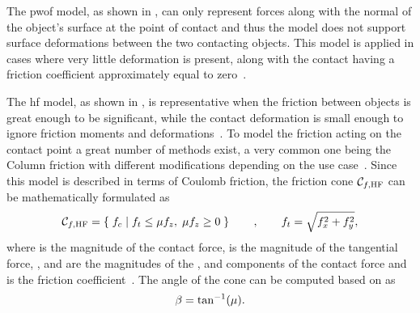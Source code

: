 The \gls{pwof} model, as shown in , can only represent forces along with the normal of the object's surface at the point of contact and thus the model does not support surface deformations between the two contacting objects. This model is applied in cases where very little deformation is present, along with the contact having a friction coefficient approximately equal to zero~\cite[Chapter 38]{handbook-of-robotics}.\medskip


The \gls{hf} model, as shown in , is representative when the friction between objects is great enough to be significant, while the contact deformation is small enough to ignore friction moments and deformations~\cite[Chapter 38]{handbook-of-robotics}. To model the friction acting on the contact point a great number of methods exist, a very common one being the Column friction with different modifications depending on the use case~\cite{modelling-of-joint-friction-in-robotic-manipulators-with-gear-transmissions}. Since this model is described in terms of Coulomb friction, the friction cone $\mathcal{C}_{f,\text{HF}}$ can be mathematically formulated as
%
\begin{equation} 
	\mathcal{C}_{f,\text{HF}} = \left\{ \; f_c\; \middle|\; f_{t} \le \mu f_z,\; \mu f_z \ge 0 \; \right\} \qquad , \qquad f_t = \sqrt{f_x^2 + f_y^2},
	\label{eq:hf}
\end{equation}
where  is the magnitude of the contact force,  is the magnitude of the tangential force, ,  and  are the magnitudes of the ,  and  components of the contact force and \mvar{\mu} is the friction coefficient~\cite[Chapter 37]{handbook-of-robotics}. The angle of the cone \mvar{\beta} can be computed based on \mvar{\mu} as
%
\begin{equation} 
	\beta = \tan^{-1} (\mu).
	\label{eq:hf-cone-angle}
\end{equation}

